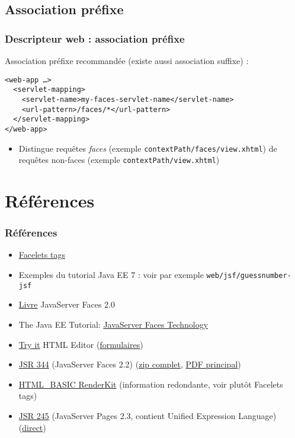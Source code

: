\documentclass[english, french]{beamer}
\begin{document}
\subsection{Association préfixe}
\begin{frame}[fragile]
	\frametitle{Descripteur web : association préfixe}
	Association préfixe recommandée {\tiny (existe aussi association suffixe)} :
	\begin{lstlisting}[aboveskip=1em, belowskip=1em]
<web-app …>
  <servlet-mapping>
    <servlet-name>my-faces-servlet-name</servlet-name>
    <url-pattern>/faces/*</url-pattern>
  </servlet-mapping>
</web-app>
	\end{lstlisting}
	\begin{itemize}
		\item Distingue requêtes \emph{faces} (exemple \texttt{contextPath/faces/view.xhtml}) de requêtes non-faces (exemple \texttt{contextPath/view.xhtml})
	\end{itemize}
\end{frame}

\section{Références}
\begin{frame}
	\frametitle{Références}
	\begin{itemize}
		\item \href{https://docs.oracle.com/javaee/7/javaserver-faces-2-2/vdldocs-facelets/toc.htm}{Facelets tags}
		\item Exemples du tutorial Java EE 7 : voir par exemple \texttt{web/jsf/guessnumber-jsf}
		\item \href{http://gen.lib.rus.ec/book/index.php?md5=DED75FBAF79F19E9473C4EDF96EC9B57}{Livre} JavaServer Faces 2.0
		\item The Java EE Tutorial: \href{https://docs.oracle.com/javaee/7/tutorial/jsf-intro.htm}{JavaServer Faces Technology}
		\item \href{https://www.w3schools.com/tags/tryit.asp?filename=tryhtml_basic}{Try it} HTML Editor (\href{https://www.w3schools.com/tags/tryit.asp?filename=tryhtml_form_method}{formulaires})
		\item \href{https://jcp.org/en/jsr/detail?id=344}{JSR 344} (JavaServer Faces 2.2) (\href{http://download.oracle.com/otn-pub/jcp/jsf-2_2-fr-eval-spec/javax.faces-api-2.2-FINAL.zip}{zip complet}, \href{http://www.sws.bfh.ch/~fischli/courses/eadj/jsf/doc/JSF_20130320.pdf}{PDF principal})
		\item \href{https://docs.oracle.com/javaee/7/javaserver-faces-2-2/renderkitdocs/toc.htm}{HTML\_BASIC RenderKit} (information redondante, voir plutôt Facelets tags)
		\item \href{https://jcp.org/en/jsr/detail?id=245}{JSR 245} (JavaServer Pages 2.3, contient Unified Expression Language) (\href{http://download.oracle.com/otn-pub/jcp/jsp-2_3-mrel2-eval-spec/JSP2.3MR.pdf}{direct})
	\end{itemize}
\end{frame}
\end{document}
